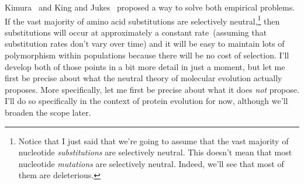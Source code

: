 Kimura~\cite{Kimura68} and King and Jukes~\cite{King-Jukes69} proposed
a way to solve both empirical problems. If the vast majority of amino
acid substitutions are selectively neutral,\footnote{Notice that I
  just said that we're going to assume that the vast majority of
  nucleotide {\it substitutions\/} are selectively neutral. This
  doesn't mean that most nucleotide {\it mutations\/} are selectively
  neutral. Indeed, we'll see that most of them are deleterious.} then
substitutions will occur at approximately a constant rate~(assuming
that substitution rates don't vary over time) and it will be easy to
maintain lots of polymorphism within populations because there will be
no cost of selection. I'll develop both of those points in a bit more
detail in just a moment, but let me first be precise about what the
neutral theory of molecular evolution actually proposes. More
specifically, let me first be precise about what it does {\it not\/}
propose. I'll do so specifically in the context of protein evolution
for now, although we'll broaden the scope later.

